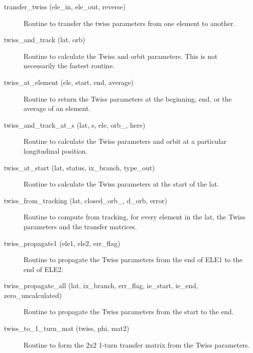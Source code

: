 \begin{description}
\label{r:transfer.twiss}
\item[transfer_twiss (ele_in, ele_out, reverse)] \Newline 
Routine to transfer the twiss parameters from one element to another.

\item[twiss_and_track (lat, orb)] \Newline
Routine to calculate the Twiss and orbit parameters. 
This is not necessarily the fastest routine. 

\label{r:twiss.at.element}
\item[twiss_at_element (ele, start, end, average)] \Newline
Routine to return the Twiss parameters at the beginning, end, or the average of an element. 

\item[twiss_and_track_at_s (lat, s, ele, orb_, here)] \Newline
Routine to calculate the Twiss parameters and orbit at a particular longitudinal position. 

\label{r:twiss.at.start}
\item[twiss_at_start (lat, status, ix_branch, type_out)] \Newline
Routine to calculate the Twiss parameters at the start of the lat. 

\label{r:twiss.from.tracking}
\item[twiss_from_tracking (lat, closed_orb_, d_orb, error)] \Newline
Routine to compute from tracking, for every element in the lat, 
the Twiss parameters and the transfer matrices. 

\label{r:twiss.propagate1}
\item[twiss_propagate1 (ele1, ele2, err_flag)] \Newline
Routine to propagate the Twiss parameters from the end of ELE1 to the end of ELE2. 

\label{r:twiss.propagate.all}
\item[twiss_propagate_all (lat, ix_branch, err_flag, ie_start, ie_end, zero_uncalculated)] \Newline
Routine to propagate the Twiss parameters from the start to the end. 

\label{r:twiss.to.1.turn.mat}
\item[twiss_to_1_turn_mat (twiss, phi, mat2)] \Newline
Routine to form the 2x2 1-turn transfer matrix from the Twiss parameters. 

\end{description}

